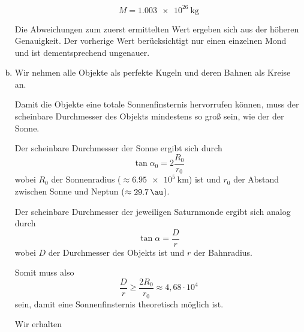 \documentclass[a4paper,german,12pt,smallheadings]{scrartcl}
\begin{document}
\begin{enumerate}[a)]
    \begin{equation}
      M = \SI{1.003e26}{\kilogram}
    \end{equation}

    Die Abweichungen zum zuerst ermittelten Wert ergeben sich aus der höheren
    Genauigkeit. Der vorherige Wert berücksichtigt nur einen einzelnen Mond und
    ist dementsprechend ungenauer.
  \item
    Wir nehmen alle Objekte als perfekte Kugeln und deren Bahnen als Kreise an.

    Damit die Objekte eine totale Sonnenfinsternis hervorrufen können, muss der
    scheinbare Durchmesser des Objekts mindestens so groß sein, wie der der
    Sonne.

    Der scheinbare Durchmesser der Sonne ergibt sich durch
    \begin{equation}
      \tan \alpha_0 = 2 \frac{R_0}{r_0}
    \end{equation}
    wobei $R_0$ der Sonnenradius ($\approx \SI{6.95e5}{\kilo\meter}$) ist und $r_0$
    der Abstand zwischen Sonne und Neptun ($\approx \SI{29.7}{\au}$).

    Der scheinbare Durchmesser der jeweiligen Saturnmonde ergibt sich analog
    durch
    \begin{equation}
      \tan \alpha = \frac{D}{r}
    \end{equation}
    wobei $D$ der Durchmesser des Objekts ist und $r$ der Bahnradius.

    Somit muss also
    \begin{equation}
      \frac{D}{r} \ge \frac{2R_0}{r_0} \approx 4{,}68 \cdot 10^{4}
    \end{equation}
    sein, damit eine Sonnenfinsternis theoretisch möglich ist.

    Wir erhalten


\end{enumerate}
\end{document}
